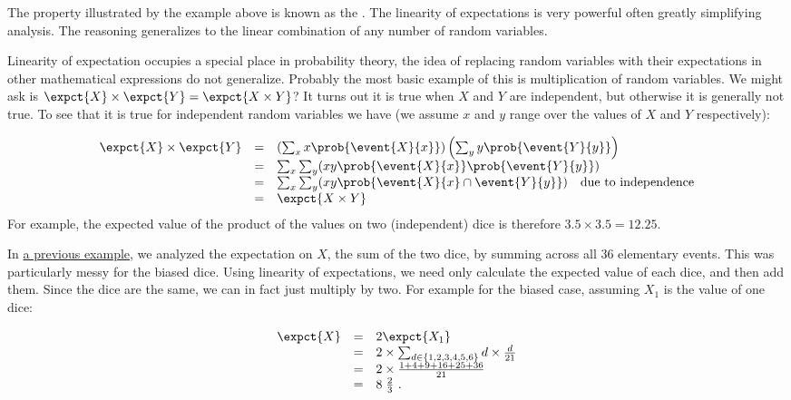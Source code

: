 \begin{flex}
\begin{gram}
The property illustrated by the example above is known as the .
%
The linearity of expectations is very powerful often greatly simplifying
analysis.
%
The reasoning generalizes to the linear combination of any number of
random variables.

Linearity of expectation occupies a special place in probability
theory, the idea of replacing random variables with their expectations
in other mathematical expressions do not generalize.
%
Probably the most basic example of this is multiplication of random
variables.
%
We might ask is $\expct{X} \times \expct{Y} = \expct{X \times
  Y}$?  
%
It turns out it is true when $X$ and $Y$ are independent, but
otherwise it is generally not true. 
%
To see that it is true for
independent random variables we have (we assume $x$ and $y$ range over
the values of $X$ and $Y$ respectively):

\[
\begin{array}{lcl}
\expct{X} \times \expct{Y} & = & \left(\sum_{x} x \prob{\event{X}{x}}\right) \left(\sum_{y} y \prob{\event{Y}{y}}\right)\\
 & = & \sum_x \sum_y (x y \prob{\event{X}{x}} \prob{\event{Y}{y}}) \\
 & = & \sum_x \sum_y (x y \prob{\event{X}{x} \cap \event{Y}{y}})~~~\mbox{due to independence} \\
 & = & \expct{X \times Y}
\end{array}
\]
For example, the expected value of the product of the values on two
(independent) dice is therefore $3.5 \times 3.5 = 12.25$.
\end{gram}

\begin{example}
In \href{ex:probability::expectation::dice}{a previous example}, we analyzed the expectation on $X$, the sum of the two dice, by summing across all 36 elementary events.  This was particularly messy for the biased dice.  Using
linearity of expectations, we need only calculate the expected value
of each dice, and then add them.  Since the dice are the same, we can
in fact just multiply by two.  For example for the biased case,
assuming $X_1$ is the value of one dice:

\[ 
\begin{array}{lcl}
\expct{X}  & =  & 2 \expct{X_1} 
\\
 & = & 2 \times \sum_{d \in \{1,2,3,4,5,6\}} d \times \frac{d}{21}
\\
 & = & 2 \times \frac{1 + 4 + 9 + 16 + 25 + 36}{21}
\\
 & = & 8 \; \frac{2}{3}~.
\end{array}
\]
\end{example}
\end{flex}

